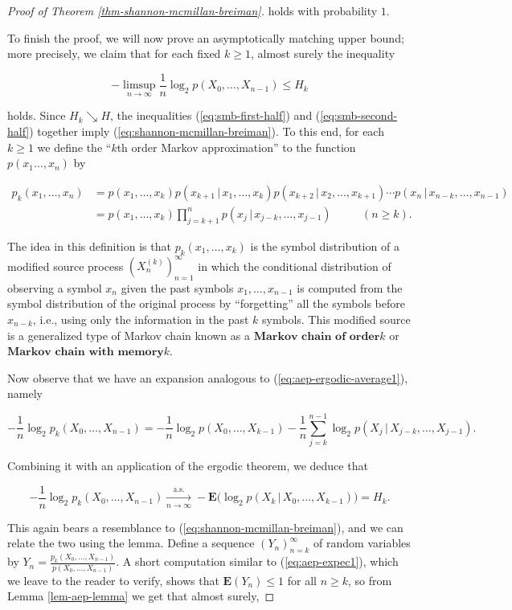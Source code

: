 \documentclass[11pt]{report}
\theoremstyle{plain}
\theoremstyle{definition}
\begin{document}
\begin{proof}[Proof of Theorem \ref{thm-shannon-mcmillan-breiman}]
holds with probability $1$.

To finish the proof, we will now prove an asymptotically matching upper bound; more precisely, we claim that for each fixed $k\ge1$, almost surely the inequality

\begin{equation*} \tag{41}\label{eq:smb-second-half}
-\limsup_{n\to\infty} \frac{1}{n} \log_2 p(X_0,\ldots,X_{n-1}) \le H_k
\end{equation*}

holds. Since $H_k \searrow H$, the inequalities (\ref{eq:smb-first-half}) and (\ref{eq:smb-second-half}) together imply (\ref{eq:shannon-mcmillan-breiman}). To this end, for each $k\ge 1$ we define the ``$k$th order Markov approximation'' to the function $p(x_1\ldots,x_n)$ by

\begin{align*}
p_k(x_1,\ldots,x_n) &= p(x_1,\ldots,x_k) p(x_{k+1}\,|\,x_1,\ldots,x_k)
p(x_{k+2}\,|\,x_2,\ldots,x_{k+1}) \cdots p(x_n\,|\, x_{n-k},\ldots, x_{n-1}) \\ &= p(x_1,\ldots,x_k)
\prod_{j=k+1}^n p(x_j\,|\, x_{j-k},\ldots,x_{j-1}) \qquad \ \ \ (n\ge k).
\end{align*}

The idea in this definition is that $p_k(x_1,\ldots,x_k)$ is the symbol distribution of a modified source process $(X_n^{(k)})_{n=1}^\infty$ in which the conditional distribution of observing a symbol $x_n$ given the past symbols $x_1,\ldots,x_{n-1}$ is computed from the symbol distribution of the original process by ``forgetting'' all the symbols before $x_{n-k}$, i.e., using only the information in the past $k$ symbols. This modified source is a generalized type of Markov chain known as a $\textbf{Markov chain of order$k$}$ or $\textbf{Markov chain with memory$k$}$.

Now observe that we have an expansion analogous to (\ref{eq:aep-ergodic-average1}), namely

\[
-\frac{1}{n} \log_2 p_k(X_0,\ldots,X_{n-1}) = -\frac{1}{n} \log_2 p(X_0,\ldots,X_{k-1}) - \frac{1}{n} \sum_{j=k}^{n-1} \log_2 p(X_j\,|\,X_{j-k},\ldots,X_{j-1}).
\]

Combining it with an application of the ergodic theorem, we deduce that

\[
-\frac{1}{n} \log_2 p_k(X_0,\ldots,X_{n-1}) \xrightarrow[n\to\infty]{\textrm{a.s.}} -\mathbf{E} \big(\log_2 p(X_k\,|\,X_0,\ldots,X_{k-1})\big) = H_k.
\]

This again bears a resemblance to (\ref{eq:shannon-mcmillan-breiman}), and we can relate the two using the lemma. Define a sequence $(Y_n)_{n=k}^\infty$ of random variables by $Y_n = \frac{p_k(X_0,\ldots,X_{n-1})}{p(X_0,\ldots,X_{n-1})}$. A short computation similar to (\ref{eq:aep-expec1}), which we leave to the reader to verify, shows that $\mathbf{E}(Y_n) \le 1$ for all $n\ge k$, so from Lemma \ref{lem-aep-lemma} we get that almost surely,


\end{proof}
\end{document}
